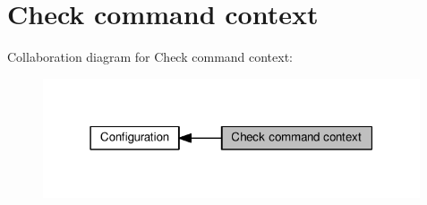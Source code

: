 \hypertarget{group__ap__check__cmd__context}{}\section{Check command context}
\label{group__ap__check__cmd__context}
Collaboration diagram for Check command context\+:
\nopagebreak
\begin{figure}[H]
\begin{center}
\leavevmode
\includegraphics[width=316pt]{group__ap__check__cmd__context}
\end{center}
\end{figure}
